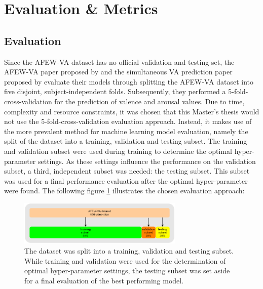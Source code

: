 
\section{Evaluation \& Metrics}
\subsection{Evaluation} \label{sec:TrainValTestSplit}
Since the AFEW-VA dataset has no official validation and testing set, the AFEW-VA paper proposed by \citet{Kossaifi:2017:AFEW-VADatabase} and the simultaneous VA prediction paper proposed by \citet{Handrich:2020:SimultaneousPredVA} evaluate their models through splitting the AFEW-VA dataset into five disjoint, subject-independent folds. Subsequently, they performed a 5-fold-cross-validation for the prediction of valence and arousal values. 
\newline\newline
Due to time, complexity and resource constraints, it was chosen that this Master's thesis would not use the 5-fold-cross-validation evaluation approach. Instead, it makes use of the more prevalent method for machine learning model evaluation, namely the split of the dataset into a training, validation and testing subset. The training and validation subset were used during training to determine the optimal hyper-parameter settings. As these settings influence the performance on the validation subset, a third, independent subset was needed: the testing subset. This subset was used for a final performance evaluation after the optimal hyper-parameter were found.
\newline\newline
The following figure \ref{fig:TrainValTestSplit} illustrates the chosen evaluation approach:

\begin{figure}[H]
  \begin{center}
  \includegraphics[angle=0, width=0.7\textwidth]{Figures/TrainValTestSplit.png}
  \caption{The dataset was split into a training, validation and testing subset. While training and validation were used for the determination of optimal hyper-parameter settings, the testing subset was set aside for a final evaluation of the best performing model.}
  \label{fig:TrainValTestSplit}
  \end{center}
\end{figure}

